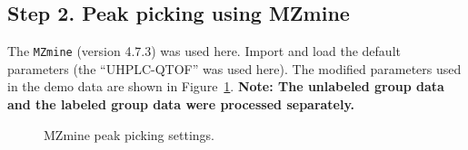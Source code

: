 \documentclass[
  letterpaper,
  DIV=11,
  numbers=noendperiod]{scrreprt}
\begin{document}
\subsection{Step 2. Peak picking using
MZmine}\label{step-2.-peak-picking-using-mzmine}

The \texttt{MZmine} (version 4.7.3) was used here. Import and load the
default parameters (the ``UHPLC-QTOF'' was used here). The modified
parameters used in the demo data are shown in
Figure~\ref{fig-figure2-5}. \textbf{Note: The unlabeled group data and
the labeled group data were processed separately.}

\begin{figure}


\caption{\label{fig-figure2-5}MZmine peak picking settings.}

\end{figure}%
\end{document}
